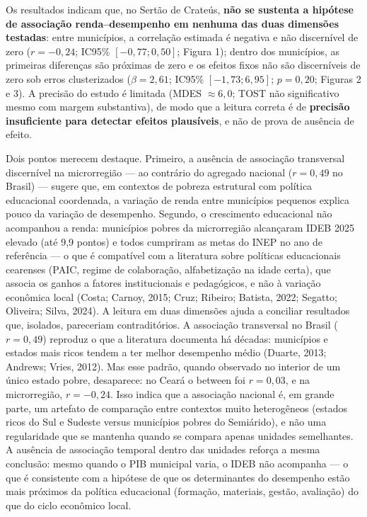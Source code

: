 \documentclass[12pt,a4paper]{article}
\begin{document}
Os resultados indicam que, no Sertão de Crateús, \textbf{não se sustenta a hipótese de associação renda--desempenho em nenhuma das duas dimensões testadas}: entre municípios, a correlação estimada é negativa e não discernível de zero ($r = -0{,}24$; IC95\% $[-0{,}77; 0{,}50]$; Figura 1); dentro dos municípios, as primeiras diferenças são próximas de zero e os efeitos fixos não são discerníveis de zero sob erros clusterizados ($\beta = 2{,}61$; IC95\% $[-1{,}73; 6{,}95]$; $p = 0{,}20$; Figuras 2 e 3). A precisão do estudo é limitada (MDES $\approx 6{,}0$; TOST não significativo mesmo com margem substantiva), de modo que a leitura correta é de \textbf{precisão insuficiente para detectar efeitos plausíveis}, e não de prova de ausência de efeito.

Dois pontos merecem destaque. Primeiro, a ausência de associação transversal discernível na microrregião --- ao contrário do agregado nacional ($r = 0{,}49$ no Brasil) --- sugere que, em contextos de pobreza estrutural com política educacional coordenada, a variação de renda entre municípios pequenos explica pouco da variação de desempenho. Segundo, o crescimento educacional não acompanhou a renda: municípios pobres da microrregião alcançaram IDEB 2025 elevado (até 9,9 pontos) e todos cumpriram as metas do INEP no ano de referência --- o que é compatível com a literatura sobre políticas educacionais cearenses (PAIC, regime de colaboração, alfabetização na idade certa), que associa os ganhos a fatores institucionais e pedagógicos, e não à variação econômica local (Costa; Carnoy, 2015; Cruz; Ribeiro; Batista, 2022; Segatto; Oliveira; Silva, 2024).
A leitura em duas dimensões ajuda a conciliar resultados que, isolados, pareceriam contraditórios. A associação transversal no Brasil ($r = 0{,}49$) reproduz o que a literatura documenta há décadas: municípios e estados mais ricos tendem a ter melhor desempenho médio (Duarte, 2013; Andrews; Vries, 2012). Mas esse padrão, quando observado no interior de um único estado pobre, desaparece: no Ceará o between foi $r = 0{,}03$, e na microrregião, $r = -0{,}24$. Isso indica que a associação nacional é, em grande parte, um artefato de comparação entre contextos muito heterogêneos (estados ricos do Sul e Sudeste versus municípios pobres do Semiárido), e não uma regularidade que se mantenha quando se compara apenas unidades semelhantes. A ausência de associação temporal dentro das unidades reforça a mesma conclusão: mesmo quando o PIB municipal varia, o IDEB não acompanha --- o que é consistente com a hipótese de que os determinantes do desempenho estão mais próximos da política educacional (formação, materiais, gestão, avaliação) do que do ciclo econômico local.
\end{document}

